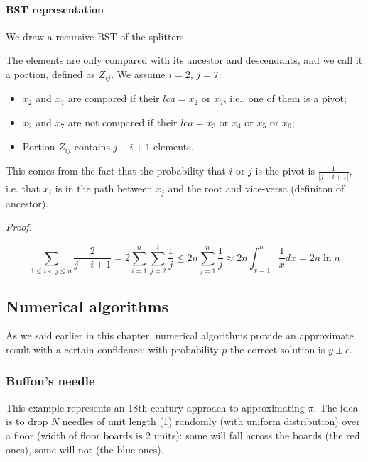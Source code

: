 \paragraph{BST representation} We draw a recursive BST of the splitters.


The elements are only compared with its ancestor and descendants, and we call it a portion, defined as $Z_{ij}$. We assume $i=2$, $j=7$:
\begin{itemize}
    \item $x_2$ and $x_7$ are compared if their $lca = x_2$ or $x_7$, i.e., one of them is a pivot;
    \item $x_2$ and $x_7$ are not compared if their $lca = x_3$ or $x_4$ or $x_5$ or $x_6$;
    \item Portion $Z_{ij}$ contains $j-i+1$ elements.
\end{itemize}




This comes from the fact that the probability that $i$ or $j$ is the pivot is $\frac{1}{|j-i+1|}$, i.e. that $x_i$ is in the path between $x_j$ and the root and vice-versa (definiton of ancestor).


\textit{Proof.}

$$
\sum_{1 \leq i < j \leq n} \frac{2}{j-i+1} = 2 \sum_{i = 1}^n \sum_{j = 2}^i \frac{1}{j} \leq 2n \sum_{j = 1}^n \frac{1}{j} \approx 2n \int_{x = 1}^n \frac{1}{x} dx = 2n \ln n
$$


\subsection{Numerical algorithms}
As we said earlier in this chapter, numerical algorithms provide an approximate result with a certain confidence: with probability $p$ the correct solution is $y \pm \epsilon$.


\subsubsection{Buffon's needle}
This example represents an 18th century approach to approximating $\pi$. The idea is to drop $N$ needles of unit length (1) randomly (with uniform distribution) over a floor (width of floor boards is 2 units): some will fall across the boards (the red ones), some will not (the blue ones).

